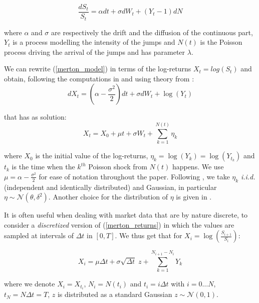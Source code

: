 \begin{equation}
\label{merton_model}
\frac{dS_t}{S_t} = \alpha dt + \sigma dW_t  + (Y_t-1)dN
\end{equation}

where $\alpha$ and $\sigma$ are respectively the drift and the diffusion of the continuous part, $Y_t$ is a process modelling the intensity of the jumps and $N(t)$ is the Poisson process driving the arrival of the jumps and has parameter $\lambda$.

We can rewrite (\ref{merton_model}) in terms of the log-returns $X_t = log(S_t)$ and obtain, following the computations in \cite{MARTIN2007} and using theory from \cite{TANKOV2015}:
\begin{equation}
dX_t = (\alpha - \frac{\sigma^2}{2})dt + \sigma dW_t + \log (Y_t)
\end{equation}

that has as solution:
\begin{equation}
\label{merton_returns}
X_t =X_0 +  \mu t + \sigma W_t + \sum_{k=1}^{N(t)} \eta_k
\end{equation}

where $X_0$ is the initial value of the log-returns, $\eta_k= \log(Y_k) = \log(Y_{t_k})$ and $t_k$ is the time when the $k^{th}$ Poisson shock from $N(t)$ happens. We use $\mu = \alpha - \frac{\sigma^2}{2} $ for ease of notation throughout the paper.
Following \cite{MERTON1976}, we take $\eta_k$ \textit{i.i.d.} (independent and identically distributed) and Gaussian, in particular $\eta \sim \mathcal{N}(\theta, \delta^2)$.
Another choice for the distribution of $\eta$ is given in \cite{KOU2002}. 


It is often useful when dealing with market data that are by nature discrete, to consider a \textit{discretized} version of (\ref{merton_returns}) in which the values are sampled at intervals of $\Delta t$ in $[0, T]$. We thus get that for $X_i = \log(\frac{S_{i+1}}{S_i})$:

\begin{equation}
\label{discrete_returns}
X_i =  \mu \Delta t + \sigma \sqrt{\Delta t} \; z +  \sum_{k=1}^{N_{i+1} - N_i} Y_k
\end{equation}

where we denote $X_i = X_{t_i}$, $N_i = N(t_i)$ and $t_i = i \Delta t$ with $i= 0 \dots N$, $t_N = N \Delta t= T$,  $z$ is distributed as a standard Gaussian $ z\sim \mathcal{N}(0,1)$.

